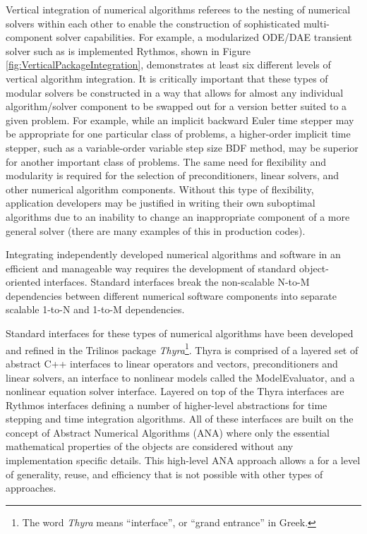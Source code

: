 \documentclass[pdf,ps2pdf,11pt]{SANDreport}
\begin{document}
Vertical integration of numerical algorithms referees to the nesting of
numerical solvers within each other to enable the construction of
sophisticated multi-component solver capabilities.  For example, a modularized
ODE/DAE transient solver such as is implemented Rythmos, shown in Figure
{}\ref{fig:VerticalPackageIntegration}, demonstrates at least six different
levels of vertical algorithm integration.  It is critically important that
these types of modular solvers be constructed in a way that allows for
almost any individual algorithm/solver component to be swapped out for a
version better suited to a given problem.  For example, while an implicit
backward Euler time stepper may be appropriate for one particular class of
problems, a higher-order implicit time stepper, such as a variable-order
variable step size BDF method, may be superior for another important class of
problems.  The same need for flexibility and modularity is required for the
selection of preconditioners, linear solvers, and other numerical algorithm
components.  Without this type of flexibility, application developers may be
justified in writing their own suboptimal algorithms due to an inability to
change an inappropriate component of a more general solver (there are many
examples of this in production codes).

Integrating independently developed numerical algorithms and software in an
efficient and manageable way requires the development of standard
object-oriented interfaces.  Standard interfaces break the non-scalable N-to-M
dependencies between different numerical software components into separate
scalable 1-to-N and 1-to-M dependencies.

Standard interfaces for these types of numerical algorithms have been developed
and refined in the Trilinos package {}\textit{Thyra}\footnote{The word
{}\textit{Thyra} means ``interface'', or ``grand entrance'' in Greek.}.  Thyra
is comprised of a layered set of abstract C++ interfaces to linear operators
and vectors, preconditioners and linear solvers, an interface to nonlinear
models called the ModelEvaluator, and a nonlinear equation solver interface.
Layered on top of the Thyra interfaces are Rythmos interfaces defining a
number of higher-level abstractions for time stepping and time integration
algorithms.  All of these interfaces are built on the concept of Abstract
Numerical Algorithms (ANA) where only the essential mathematical properties of
the objects are considered without any implementation specific details.  This
high-level ANA approach allows a for a level of generality, reuse, and
efficiency that is not possible with other types of approaches.
\end{document}
